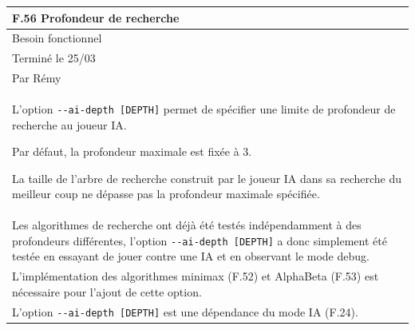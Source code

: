 \documentclass[a4paper,12pt]{article}
\begin{document}
\vspace{1cm}

\noindent
\setlength{\arrayrulewidth}{1.5pt}
\renewcommand{\arraystretch}{1.5}
\begin{tabularx}{\textwidth}{|X|}
    \hline
    \textbf{F.56 Profondeur de recherche}                                        \\
    \hline
    Besoin fonctionnel                                                           \\
    \hline
    Terminé le 25/03                                                             \\
    Par Rémy                                                                     \\
    \hline
    L’option \texttt{-}\texttt{-ai-depth [DEPTH]} permet de spécifier une limite de profondeur de recherche au joueur IA.

    Par défaut, la profondeur maximale est fixée à 3.

    La taille de l’arbre de recherche construit par le joueur IA dans sa recherche
    du meilleur coup ne dépasse pas la profondeur maximale spécifiée.            \\
    \arrayrulecolor{MediumAquamarine}\hline \arrayrulecolor{CornflowerBlue} Les
    algorithmes de recherche ont déjà été testés indépendamment à des profondeurs
    différentes, l’option \texttt{-}\texttt{-ai-depth [DEPTH]} a donc simplement
    été testée en essayant de jouer contre une IA et en observant le mode debug. \\
    \arrayrulecolor{MediumAquamarine}\hline \arrayrulecolor{CornflowerBlue}
    L'implémentation des algorithmes minimax (F.52) et AlphaBeta (F.53) est
    nécessaire pour l'ajout de cette option.                                     \\ L'option
    \texttt{-}\texttt{-ai-depth [DEPTH]} est une dépendance du mode IA (F.24).   \\
    \hline
\end{tabularx}

\vspace{1cm}
\end{document}
